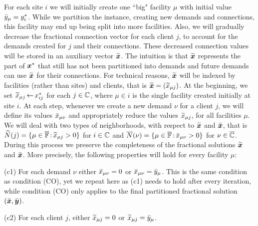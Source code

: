 \documentclass[11pt]{article}
\begin{document}
For each site $i$ we will initially create one ``big"
facility $\mu$ with initial value ${\bar y}_\mu = y^\ast_i$.
While we partition the instance, creating new demands and connections,
this facility may end up being split into more facilities. Also, 
we will gradually decrease the fractional connection vector for each client $j$, 
to account for the demands created for $j$ and their connections.
These decreased connection
values will be stored in an auxiliary vector $\widetilde{\boldsymbol{x}}$. The intuition
is that $\widetilde{\boldsymbol{x}}$ represents the part of $\boldsymbol{x}^\ast$ that
still has not been partitioned into demands and future
demands can use $\widetilde{\boldsymbol{x}}$ for their connections. For technical reasons,
$\widetilde{\boldsymbol{x}}$ will be indexed by facilities (rather than
sites) and clients, that is $\widetilde{\boldsymbol{x}} = ({\widetilde x}_{\mu j})$.
At the beginning, we set ${\widetilde x}_{\mu j}{\,\leftarrow\,}
x_{ij}^\ast$ for each $j\in\mathbb{C}$, where $\mu\in i$ is
the single facility created initially at site $i$.  At each
step, whenever we create a new demand $\nu$ for a client
$j$, we will define its values ${\bar x}_{\mu\nu}$ and
appropriately reduce the values ${\widetilde x}_{\mu j}$, for all 
facilities $\mu$. We will deal with
two types of neighborhoods, with respect to  $\widetilde{\boldsymbol{x}}$ and $\bar{\boldsymbol{x}}$,
that is
${\widetilde N}(j)=\{\mu\in\overline{\mathbb{F}} {\,:\,}{\widetilde x}_{\mu j} > 0\}$ for $i\in\mathbb{C}$
and ${\overline{N}}(\nu)=\{\mu\in\overline{\mathbb{F}} {\,:\,} {\bar x}_{\mu\nu} >0\}$ for $\nu\in\overline{\mathbb{C}}$.
During this process we preserve the completeness of the
fractional solutions $\widetilde{\boldsymbol{x}}$ and $\bar{\boldsymbol{x}}$. More precisely, the following
properties will hold for every facility $\mu$: 
%
\begin{description}
	
	\item{(c1)} For each demand $\nu$ either ${\bar x}_{\mu\nu}=0$ or
			${\bar x}_{\mu\nu}={\bar y}_{\mu}$. This is the same
      condition as condition (CO), yet we repeat here as
      (c1) needs to hold after every iteration, while
      condition (CO) only applies to the final partitioned
      fractional solution $(\bar{\boldsymbol{x}}, \bar{\boldsymbol{y}})$.

	\item{(c2)} For each client $j$,
			either ${\widetilde x}_{\mu j}=0$ or ${\widetilde x}_{\mu j}={\bar y}_{\mu}$.
			
\end{description}
\end{document}
